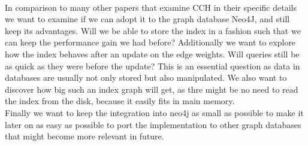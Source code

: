 \\
In comparison to many other papers that examine CCH in their specific details we want to examine if we can adopt it to the graph database Neo4J, and still keep its advantages.
Will we be able to store the index in a fashion such that we can keep the performance gain we had before?
Additionally we want to explore how the index behaves after an update on the edge weights.
Will queries still be as quick as they were before the update?
This is an essential question as data in databases are usually not only stored but also manipulated.
We also want to discover how big such an index graph will get, as thre might be no need to read the index from the disk, because it easily fits in main memory.
\\
Finally we want to keep the integration into neo4j as small as possible to make it later on as easy as possible to port the implementation to other graph databases that might become more relevant in future.
